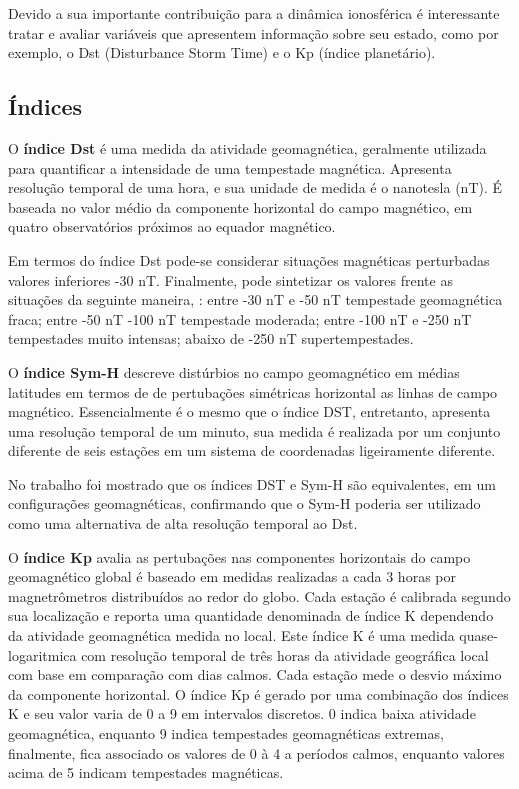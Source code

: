 Devido a sua importante contribuição para a dinâmica ionosférica é interessante tratar e avaliar variáveis que apresentem informação sobre seu estado, como por exemplo, o Dst (Disturbance Storm Time) e o Kp (índice planetário).

\subsection{Índices}

O {\bf índice Dst} é uma medida da atividade geomagnética, geralmente utilizada para quantificar a intensidade de uma tempestade magnética. Apresenta resolução temporal de uma hora, e sua unidade de medida é o nanotesla (nT). É baseada no valor médio da componente horizontal do campo magnético, em quatro observatórios próximos ao equador magnético.

Em termos do índice Dst pode-se considerar situações magnéticas perturbadas valores inferiores -30 nT. Finalmente, pode sintetizar os valores frente as situações da seguinte maneira, \cite{GONZALEZ:1994}: entre -30 nT e -50 nT tempestade geomagnética fraca; entre -50 nT -100 nT tempestade moderada; entre -100 nT e -250 nT tempestades muito intensas; abaixo de -250 nT supertempestades.

O {\bf índice Sym-H} descreve distúrbios no campo geomagnético em médias latitudes em termos de de pertubações simétricas horizontal as linhas de campo magnético. Essencialmente é o mesmo que o índice DST, entretanto, apresenta uma resolução temporal de um minuto, sua medida é realizada por um conjunto diferente de seis estações em um sistema de coordenadas ligeiramente diferente. 

No trabalho \cite{WANLISS:2006} foi mostrado que os índices DST e Sym-H são equivalentes, em um configurações geomagnéticas, confirmando que o Sym-H poderia ser utilizado como uma alternativa de alta resolução temporal ao Dst.

O {\bf índice Kp} avalia as pertubações nas componentes horizontais do campo geomagnético global é baseado em medidas realizadas a cada 3 horas por magnetrômetros distribuídos ao redor do globo. Cada estação é calibrada segundo sua localização e reporta uma quantidade denominada de índice K dependendo da atividade geomagnética medida no local. Este índice K é uma medida quase-logaritmica com resolução temporal de três horas da atividade geográfica local com base em comparação com dias calmos. Cada estação mede o desvio máximo da componente horizontal. O índice Kp é gerado por uma combinação dos índices K e seu valor varia de 0 a 9 em intervalos discretos. 0 indica baixa atividade geomagnética, enquanto 9 indica tempestades geomagnéticas extremas, finalmente, fica associado os valores de 0 à 4 a períodos calmos, enquanto valores acima de 5 indicam tempestades magnéticas.

